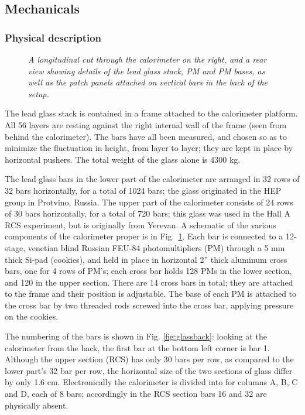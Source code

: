 \documentclass{chowto}
\begin{document}
\subsection{Mechanicals}
\label{mechanics}
\subsubsection{Physical description}
\begin{figure}[h]
\begin{center}
\caption[]{\it{A longitudinal cut through the calorimeter on the right, 
and a rear
view showing details of the lead glass stack, PM and PM bases, as well 
as the patch panels attached on vertical bars in the back of the setup.}}
\label{fig:schematicview}
\end{center}
\end{figure}

The lead glass stack is contained in a frame attached to the calorimeter 
platform. All 56 layers are resting against the right internal wall of the 
frame (seen from behind the calorimeter). The bars have all been measured, and chosen so as to minimize 
the fluctuation in height, from layer to layer; they are kept in place 
by horizontal pushers. The total weight of the glass alone is 4300 kg. 

The lead glass bars in the lower part of the calorimeter are arranged in 32
rows of 32 bars horizontally, for a total of 1024 bars; the glass originated 
in the HEP group in Protvino, Russia. The upper part of 
the calorimeter consists of 24 rows of 30 bars horizontally, for a total of 
720 bars; this glass was used in the Hall A RCS experiment, but is originally 
from Yerevan. A schematic of the various components of the calorimeter 
proper is in 
Fig.~\ref{fig:schematicview}. Each bar is connected to a 12-stage, venetian
blind Russian FEU-84 
photomultipliers (PM) 
through a 5 mm thick Si-pad (cookies), and held in place in 
horizontal 2'' thick aluminum cross bars, one for 4 rows of PM's; each 
cross bar holds 
128 PMs in the lower section, and 120 in the upper section. There are 14 
cross bars in total; they are attached to the frame and their position is
adjustable. The base of each PM is attached to the cross bar by two threaded 
rods screwed into the cross bar, applying pressure on the cookies. 

The numbering of the bars is shown in Fig. \ref{fig:glassback}: looking at the 
calorimeter from the back, the first bar at the bottom left corner is bar 1.
Although the upper section (RCS) has  only 30 bars per row, as compared to the 
lower part's 32 bar per row, the horizontal size of the two sections of glass 
differ by only 1.6 cm. Electronically the calorimeter is divided into 
for columns A, B, C and D, 
each of 8 bars; accordingly in the RCS section bars 16 and 32 are physically 
absent. 
\end{document}
